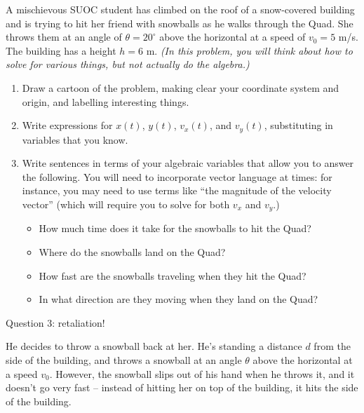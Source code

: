 \documentclass[12pt]{article}
\newcommand{\BI}{\begin{itemize}}
\newcommand{\EI}{\end{itemize}}
\begin{document}
\normalsize \bigskip\rm

A mischievous SUOC student has climbed on the roof of a snow-covered building and is trying to hit her friend with snowballs as he walks through the Quad. 
She throws them at an angle of $\theta = 20^\circ$ above the horizontal at a speed of $v_0=5$ m/s. 
The building has a height $h=6$ m. {\it (In this problem, you will think about how to solve for various things, but not actually do the algebra.)}

\begin{enumerate}

\item Draw a cartoon of the problem, making clear your coordinate system and origin, and
labelling interesting things.

\vspace{2in}

\item Write expressions for $x(t)$, $y(t)$, $v_x(t)$, and $v_y(t)$, substituting in variables that you know.


\newpage
\item Write sentences in terms of your algebraic variables that allow you to answer the following. You  
will need to incorporate vector language at times: for instance, you may need to use terms like ``the magnitude of the
velocity vector'' (which will require you to solve for both $v_x$ and $v_y$.)

\BI
\item How much time does it take for the snowballs to hit the Quad?

\vspace{1.5in}

\item Where do the snowballs land on the Quad?

\vspace{1.5in}
\item How fast are the snowballs traveling when they hit the Quad?

\vspace{1.5in}
\item In what direction are they moving when they land on the Quad?
\EI
\end{enumerate}

\newpage

\centerline{\Large Question 3: retaliation!}     

He decides to throw a snowball back at her. He's standing a distance $d$ from the side of the building, and 
throws a snowball at an angle $\theta$ above the horizontal at a speed $v_0$. However, the snowball slips out of his hand when he throws it,
and it doesn't go very fast -- instead of hitting her on top of the building, it hits the side of the building.
\end{document}
